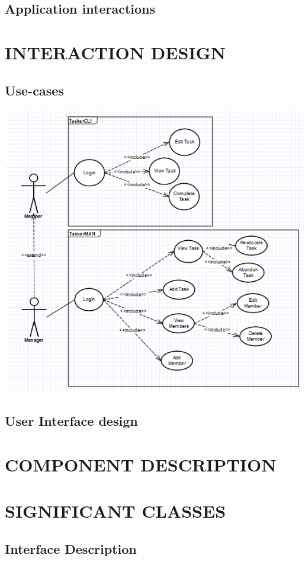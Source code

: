 \documentclass[10pt]{project}
\begin{document}
\subsection{Application interactions}

\section{INTERACTION DESIGN}
\subsection{Use-cases}
\includegraphics{usecase}

\subsection{User Interface design}

\section{COMPONENT DESCRIPTION}

\section{SIGNIFICANT CLASSES}
\subsection{Interface Description}
\end{document}
